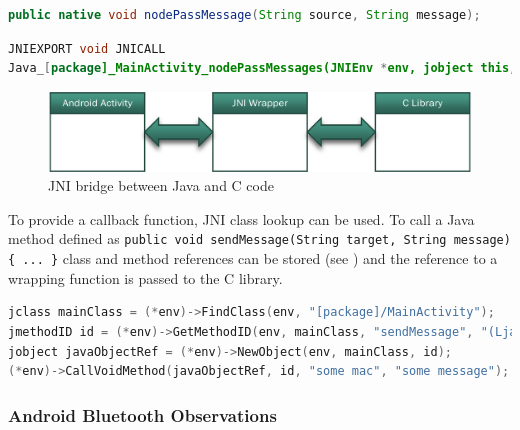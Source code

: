 \begin{lstlisting}[language=Java, caption={Method signature in MainActivity.java}, label={Method signature in MainActivity.java}, float, floatplacement=H]
public native void nodePassMessage(String source, String message);
\end{lstlisting}

\begin{lstlisting}[language=Java, caption={Function implementation in node\_wrapper.c}, label={Function implementation in node_wrapper.c}, float, floatplacement=H]
JNIEXPORT void JNICALL
Java_[package]_MainActivity_nodePassMessages(JNIEnv *env, jobject this, jstring source, jstring message) { ... }
\end{lstlisting}

\begin{figure}[!htbp] %
	\caption{\gls{JNI} bridge between Java and C code} \label{JNI bridge between Java and C code}
	\includegraphics[scale=1.0]{figures/jni_wrapper.png}
\end{figure}

To provide a callback function, \gls{JNI} class lookup can be used. To call a Java method defined as \lstinline|public void sendMessage(String target, String message){ ... }| class and method references can be stored (see ) and the reference to a wrapping function is passed to the C library.

\begin{lstlisting}[language=C, caption={Using a Java method as callback for native method}, label={Using a Java method as callback for native method}, float, floatplacement=H]
    jclass mainClass = (*env)->FindClass(env, "[package]/MainActivity");
jmethodID id = (*env)->GetMethodID(env, mainClass, "sendMessage", "(Ljava/lang/String;Ljava/lang/String;)V");
jobject javaObjectRef = (*env)->NewObject(env, mainClass, id);
(*env)->CallVoidMethod(javaObjectRef, id, "some mac", "some message");
\end{lstlisting}

\subsubsection{Android Bluetooth Observations} \label{Android Bluetooth Observations}

